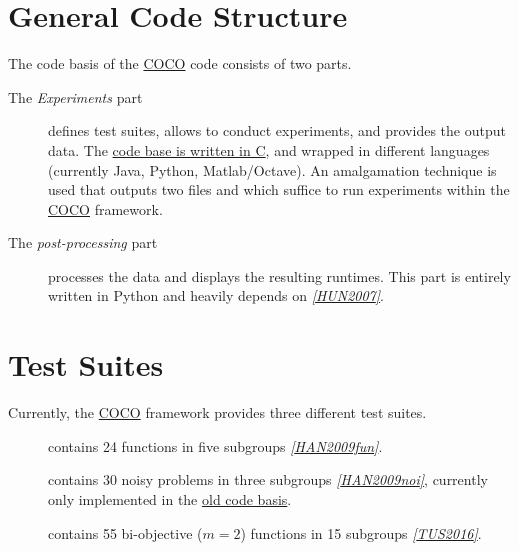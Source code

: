 \documentclass[letterpaper,12pt,english]{article}
\begin{document}
\section{General Code Structure}
\label{index:general-code-structure}
The code basis of the \href{https://github.com/numbbo/coco}{COCO} code consists of two parts.
\begin{description}
\item[{The \emph{Experiments} part}] \leavevmode
defines test suites, allows to conduct experiments, and provides the output
data. The \href{http://numbbo.github.io/coco-doc/C}{code base is written in C}, and wrapped in different languages
(currently Java, Python, Matlab/Octave). An amalgamation technique is used
that outputs two files  and  which suffice to run
experiments within the \href{https://github.com/numbbo/coco}{COCO} framework.

\item[{The \emph{post-processing} part}] \leavevmode
processes the data and displays the resulting runtimes. This part is
entirely written in Python and heavily depends on \href{http://matplotlib.org/}{} \label{index:id54}{\hyperref[index:hun2007]{\emph{{[}HUN2007{]}}}}.

\end{description}


\section{Test Suites}
\label{index:test-suites}\label{index:matplotlib}
Currently, the \href{https://github.com/numbbo/coco}{COCO} framework provides three different test suites.
\begin{description}
\item[{}] \leavevmode
contains 24 functions in five subgroups \label{index:id55}{\hyperref[index:han2009fun]{\emph{{[}HAN2009fun{]}}}}.

\item[{}] \leavevmode
contains 30 noisy problems in three subgroups \label{index:id56}{\hyperref[index:han2009noi]{\emph{{[}HAN2009noi{]}}}},
currently only implemented in the \href{http://coco.gforge.inria.fr/doku.php?id=downloads}{old code basis}.

\item[{}] \leavevmode
contains 55 bi-objective (\(m=2\)) functions in 15 subgroups \label{index:id57}{\hyperref[index:tus2016]{\emph{{[}TUS2016{]}}}}.

\end{description}
\end{document}
